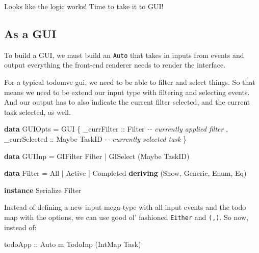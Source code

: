 \documentclass[]{article}
\newenvironment{Shaded}{}{}
\newcommand{\CommentTok}[1]{\textcolor[rgb]{0.38,0.63,0.69}{\textit{#1}}}
\newcommand{\DataTypeTok}[1]{\textcolor[rgb]{0.56,0.13,0.00}{#1}}
\newcommand{\KeywordTok}[1]{\textcolor[rgb]{0.00,0.44,0.13}{\textbf{#1}}}
\newcommand{\NormalTok}[1]{#1}
\newcommand{\OperatorTok}[1]{\textcolor[rgb]{0.40,0.40,0.40}{#1}}
\newcommand{\OtherTok}[1]{\textcolor[rgb]{0.00,0.44,0.13}{#1}}
\begin{document}
Looks like the logic works! Time to take it to GUI!

\hypertarget{as-a-gui}{%
\subsection{As a GUI}\label{as-a-gui}}

To build a GUI, we must build an \texttt{Auto} that takes in inputs from events
and output everything the front-end renderer needs to render the interface.

For a typical todomvc gui, we need to be able to filter and select things. So
that means we need to be extend our input type with filtering and selecting
events. And our output has to also indicate the current filter selected, and the
current task selected, as well.

\begin{Shaded}
\begin{Highlighting}[]
\KeywordTok{data} \DataTypeTok{GUIOpts} \OtherTok{=} \DataTypeTok{GUI}\NormalTok{ \{}\OtherTok{ \_currFilter   ::} \DataTypeTok{Filter}        \CommentTok{{-}{-} currently applied filter}
\NormalTok{                   ,}\OtherTok{ \_currSelected ::} \DataTypeTok{Maybe} \DataTypeTok{TaskID}  \CommentTok{{-}{-} currently selected task}
\NormalTok{                   \}}

\KeywordTok{data} \DataTypeTok{GUIInp} \OtherTok{=} \DataTypeTok{GIFilter} \DataTypeTok{Filter}
            \OperatorTok{|} \DataTypeTok{GISelect}\NormalTok{ (}\DataTypeTok{Maybe} \DataTypeTok{TaskID}\NormalTok{)}

\KeywordTok{data} \DataTypeTok{Filter} \OtherTok{=} \DataTypeTok{All} \OperatorTok{|} \DataTypeTok{Active} \OperatorTok{|} \DataTypeTok{Completed}
            \KeywordTok{deriving}\NormalTok{ (}\DataTypeTok{Show}\NormalTok{, }\DataTypeTok{Generic}\NormalTok{, }\DataTypeTok{Enum}\NormalTok{, }\DataTypeTok{Eq}\NormalTok{)}

\KeywordTok{instance} \DataTypeTok{Serialize} \DataTypeTok{Filter}
\end{Highlighting}
\end{Shaded}

Instead of defining a new input mega-type with all input events and the todo map
with the options, we can use good ol' fashioned \texttt{Either} and
\texttt{(,)}. So now, instead of:

\begin{Shaded}
\begin{Highlighting}[]
\OtherTok{todoApp ::} \DataTypeTok{Auto}\NormalTok{ m }\DataTypeTok{TodoInp}\NormalTok{ (}\DataTypeTok{IntMap} \DataTypeTok{Task}\NormalTok{)}
\end{Highlighting}
\end{Shaded}
\end{document}
